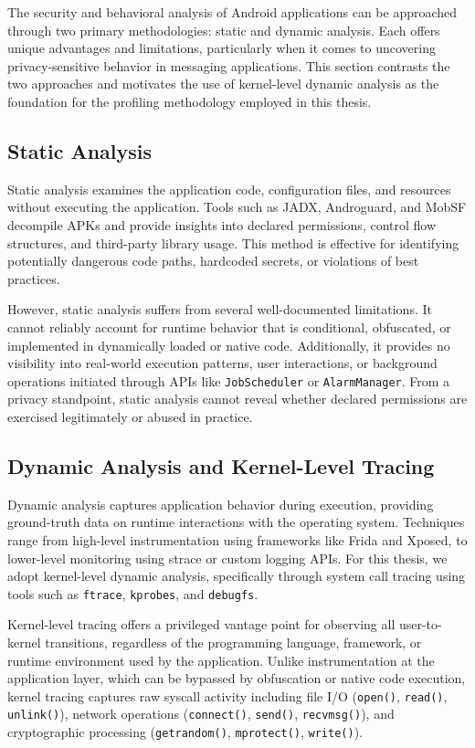 \documentclass[a4paper,12pt]{report}
\begin{document}
The security and behavioral analysis of Android applications can be approached through two primary methodologies: static and dynamic analysis. Each offers unique advantages and limitations, particularly when it comes to uncovering privacy-sensitive behavior in messaging applications. This section contrasts the two approaches and motivates the use of kernel-level dynamic analysis as the foundation for the profiling methodology employed in this thesis.

\subsection{Static Analysis}
Static analysis examines the application code, configuration files, and resources without executing the application. Tools such as JADX, Androguard, and MobSF decompile APKs and provide insights into declared permissions, control flow structures, and third-party library usage. This method is effective for identifying potentially dangerous code paths, hardcoded secrets, or violations of best practices.

However, static analysis suffers from several well-documented limitations. It cannot reliably account for runtime behavior that is conditional, obfuscated, or implemented in dynamically loaded or native code. Additionally, it provides no visibility into real-world execution patterns, user interactions, or background operations initiated through APIs like \texttt{JobScheduler} or \texttt{AlarmManager}. From a privacy standpoint, static analysis cannot reveal whether declared permissions are exercised legitimately or abused in practice.

\subsection{Dynamic Analysis and Kernel-Level Tracing}
Dynamic analysis captures application behavior during execution, providing ground-truth data on runtime interactions with the operating system. Techniques range from high-level instrumentation using frameworks like Frida and Xposed, to lower-level monitoring using strace or custom logging APIs. For this thesis, we adopt kernel-level dynamic analysis, specifically through system call tracing using tools such as \texttt{ftrace}, \texttt{kprobes}, and \texttt{debugfs}.

Kernel-level tracing offers a privileged vantage point for observing all user-to-kernel transitions, regardless of the programming language, framework, or runtime environment used by the application. Unlike instrumentation at the application layer, which can be bypassed by obfuscation or native code execution, kernel tracing captures raw syscall activity including file I/O (\texttt{open()}, \texttt{read()}, \texttt{unlink()}), network operations (\texttt{connect()}, \texttt{send()}, \texttt{recvmsg()}), and cryptographic processing (\texttt{getrandom()}, \texttt{mprotect()}, \texttt{write()}).
\end{document}
